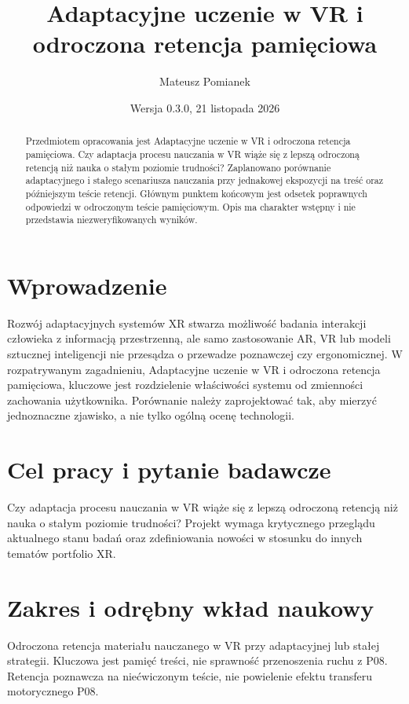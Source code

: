 \documentclass[11pt,a4paper]{article}
\title{Adaptacyjne uczenie w VR i odroczona retencja pamięciowa}
\author{Mateusz Pomianek}
\date{Wersja 0.3.0, 21 listopada 2026}
\begin{document}
\maketitle

\begin{abstract}

Przedmiotem opracowania jest Adaptacyjne uczenie w VR i odroczona retencja pamięciowa. Czy adaptacja procesu nauczania w VR wiąże się z lepszą odroczoną retencją niż nauka o stałym poziomie trudności? Zaplanowano porównanie adaptacyjnego i stałego scenariusza nauczania przy jednakowej ekspozycji na treść oraz późniejszym teście retencji. Głównym punktem końcowym jest odsetek poprawnych odpowiedzi w odroczonym teście pamięciowym. Opis ma charakter wstępny i nie przedstawia niezweryfikowanych wyników.

\end{abstract}

\section{Wprowadzenie}

Rozwój adaptacyjnych systemów XR stwarza możliwość badania interakcji człowieka z informacją przestrzenną, ale samo zastosowanie AR, VR lub modeli sztucznej inteligencji nie przesądza o przewadze poznawczej czy ergonomicznej. W rozpatrywanym zagadnieniu, Adaptacyjne uczenie w VR i odroczona retencja pamięciowa, kluczowe jest rozdzielenie właściwości systemu od zmienności zachowania użytkownika. Porównanie należy zaprojektować tak, aby mierzyć jednoznaczne zjawisko, a nie tylko ogólną ocenę technologii.

\section{Cel pracy i pytanie badawcze}

Czy adaptacja procesu nauczania w VR wiąże się z lepszą odroczoną retencją niż nauka o stałym poziomie trudności? Projekt wymaga krytycznego przeglądu aktualnego stanu badań oraz zdefiniowania nowości w stosunku do innych tematów portfolio XR.

\section{Zakres i odrębny wkład naukowy}
Odroczona retencja materiału nauczanego w VR przy adaptacyjnej lub stałej strategii. Kluczowa jest pamięć treści, nie sprawność przenoszenia ruchu z P08. Retencja poznawcza na niećwiczonym teście, nie powielenie efektu transferu motorycznego P08.
\end{document}
